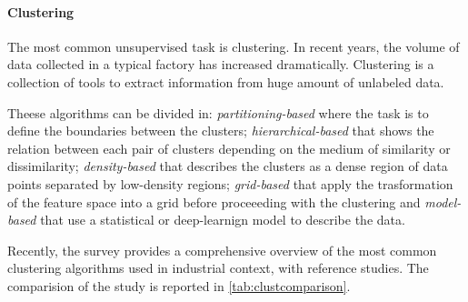 \paragraph*{Clustering}
The most common unsupervised task is clustering. In recent years, the volume of data collected in a typical factory has increased dramatically. Clustering is a collection of tools to extract information from huge amount of unlabeled data. 

Theese algorithms can be divided in: \emph{partitioning-based} where the task is to define the boundaries between the clusters; \emph{hierarchical-based} that shows the relation between each pair of clusters depending on the medium of similarity or dissimilarity; \emph{density-based} that describes the clusters as a dense region of data points separated by low-density regions; \emph{grid-based} that apply the trasformation of the feature space into a grid before proceeeding with the clustering and \emph{model-based} that use a statistical or deep-learnign model to describe the data.

Recently, the survey \cite{Abla2019survey} provides a comprehensive overview of the most common clustering algorithms used in industrial context, with reference studies. The comparision of the study is reported in \autoref{tab:clustcomparison}.

{\small}